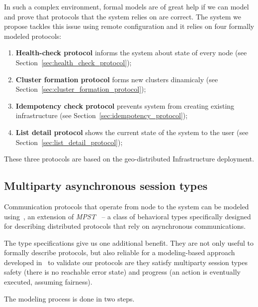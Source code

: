 In such a complex environment, formal models are of great help if we can model and prove that protocols that the system relies on are correct. The system we propose tackles this issue using remote configuration and it relies on four formally modeled protocols:

\begin{enumerate}[start=1,label={(\bfseries \arabic*)}]
	\item \textbf{Health-check protocol} informs the system about state of every node (see Section~\ref{sec:health_check_protocol});
	\item \textbf{Cluster formation protocol} forms new clusters dinamicaly (see Section~\ref{sec:cluster_formation_protocol});
	\item \textbf{Idempotency check protocol} prevents system from creating existing infrastructure (see Section~\ref{sec:idempotency_protocol});
	\item \textbf{List detail protocol} shows the current state of the system to the user (see Section~\ref{sec:list_detail_protocol});
\end{enumerate}

\noindent
These three protocols are based on the geo-distributed Infrastructure deployment.
%
%
\subsection{Multiparty asynchronous session types}\label{sec:multiparty}
%
Communication protocols that operate from node to the system can be modeled using~\cite{HuY17}, an extension of \emph{MPST}~\cite{HondaYC08} -- a class of behavioral types specifically designed for describing distributed protocols that rely on asynchronous communications. 

The type specifications give us one additional benefit. They are not only useful to formally describe protocols, but also reliable for a modeling-based approach developed in~\cite{HuY17} to validate our protocols are they satisfy multiparty session types safety (there is no reachable error state) and progress (an action is eventually executed, assuming fairness).

The modeling process is done in two steps.

